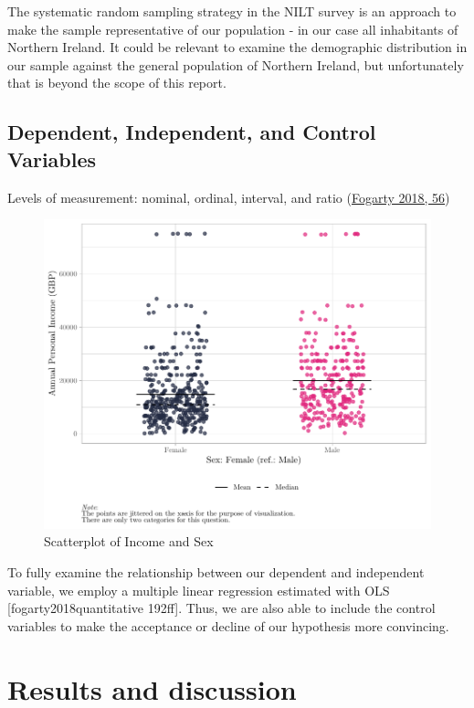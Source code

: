 \documentclass[
]{article}
\begin{document}
The systematic random sampling strategy in the NILT survey is an
approach to make the sample representative of our population - in our
case all inhabitants of Northern Ireland. It could be relevant to
examine the demographic distribution in our sample against the general
population of Northern Ireland, but unfortunately that is beyond the
scope of this report.

\hypertarget{dependent-independent-and-control-variables}{%
\subsection{Dependent, Independent, and Control
Variables}\label{dependent-independent-and-control-variables}}

Levels of measurement: nominal, ordinal, interval, and ratio
(\protect\hyperlink{ref-fogarty2018quantitative}{Fogarty 2018, 56})

\begin{figure}[H]

{\centering \includegraphics[width=0.8\linewidth]{paper_files/figure-latex/unnamed-chunk-2-1} 

}

\caption{Scatterplot of Income and Sex}\label{fig:unnamed-chunk-2}
\end{figure}

To fully examine the relationship between our dependent and independent
variable, we employ a multiple linear regression estimated with OLS
{[}fogarty2018quantitative 192ff{]}. Thus, we are also able to include
the control variables to make the acceptance or decline of our
hypothesis more convincing.

\hypertarget{results-and-discussion}{%
\section{Results and discussion}\label{results-and-discussion}}
\end{document}
